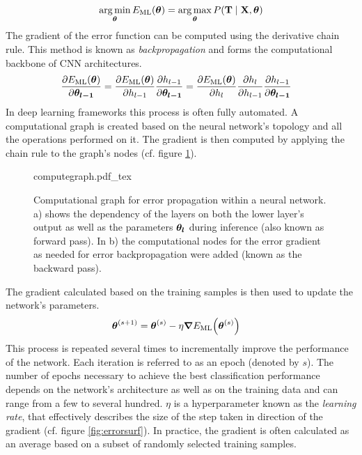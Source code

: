 \begin{align}
    \operatorname*{arg\,min}_{\vb*{\theta}} E_{\mathrm{ML}}\qty(\vb*{\theta}) = \operatorname*{arg\,max}_{\vb*{\theta}} P\qty(\vb{T}\mid \vb{X}, \vb*{\theta})
\end{align}
The gradient of the error function can be computed using the derivative chain rule. This method is known as \emph{backpropagation} and forms the computational backbone of CNN architectures.
\begin{align}
    \pdv{E_{\mathrm{ML}}\qty(\vb*{\theta})}{\vb*{\theta_{l-1}}} &= \pdv{E_{\mathrm{ML}}\qty(\vb*{\theta})}{h_{l-1}} \pdv{h_{l-1}}{\vb*{\theta_{l-1}}} = \pdv{E_{\mathrm{ML}}\qty(\vb*{\theta})}{h_l}\pdv{h_l}{h_{l-1}} \pdv{h_{l-1}}{\vb*{\theta_{l-1}}}
\end{align}\newpage\noindent
In deep learning frameworks this process is often fully automated. A computational graph is created based on the neural network's topology and all the operations performed on it. The gradient is then computed by applying the chain rule to the graph's nodes (cf. figure \ref{fig:computegraph}).
\begin{figure}[H]
    \centering
\def\svgwidth{\textwidth}
{computegraph.pdf_tex}
\caption[Computational graph for error propagation]{Computational graph for error propagation within a neural network. a) shows the dependency of the layers on both the lower layer's output as well as the parameters $\vb*{\theta_l}$ during inference (also known as forward pass). In b) the computational nodes for the error gradient as needed for error backpropagation were added (known as the backward pass).}\label{fig:computegraph}
\end{figure}\noindent
The gradient calculated based on the training samples is then used to update the network's parameters.
\begin{align}
    \vb*{\theta}^{(s+1)} &= \vb*{\theta}^{(s)}-\eta \grad{E_{\mathrm{ML}}\qty(\vb*{\theta}^{(s)})}
\end{align}
This process is repeated several times to incrementally improve the performance of the network. Each iteration is referred to as an epoch (denoted by $s$). The number of epochs necessary to achieve the best classification performance depends on the network's architecture as well as on the training data and can range from a few to several hundred. $\eta$ is a hyperparameter known as the \emph{learning rate}, that effectively describes the size of the step taken in direction of the gradient (cf. figure \ref{fig:errorsurf}). In practice, the gradient is often calculated as an average based on a subset of randomly selected training samples.

